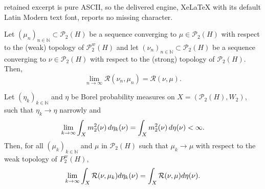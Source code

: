 \documentclass[10pt,a4paper]{amsart}
\newcommand{\N}{\mathbb{N}}
\renewcommand{\P}{\mathcal{P}}
\newcommand{\X}{\mathcal{P}_2(H)}
\renewcommand{\d}{{\rm d}}
\begin{document}
retained excerpt is pure ASCII, so the delivered engine, XeLaTeX with its default Latin Modern text font, reports no missing character.
\begin{lemma}
\label{lemma:Rcont}
Let $(\mu_n)_{n\in \N}\subset \X$ be a sequence converging to $\mu \in \X$ with respect to the (weak) topology of $\P_2^w(H)$ and let $(\nu_n)_{n\in \N}\subset \X$ be a sequence converging to $\nu \in \X$ with respect to the (strong) topology of $\P_2(H)$. 
Then, %
\begin{equation}
\label{eq:lsc_2}
	\lim_{n \to \infty}\mathcal R (\nu_n,\mu_n)=\mathcal R (\nu,\mu).
\end{equation}
\end{lemma}

\begin{lemma}
\label{lemma:gammaR}
Let $(\eta_k)_{k\in \N}$ and $\eta$ be Borel probability measures on $X=(\X,W_2)$, such that $\eta_k \to \eta$ narrowly and
\begin{equation}
\label{eq:m2conv}
	\lim_{k\to \infty} \int_{X}m_2^2(\nu)\,\d\eta_k(\nu) = \int_{X}m_2^2(\nu)\,\d\eta(\nu) < \infty.
\end{equation}
Then, for all $(\mu_k)_{k \in \N}$ and $\mu$ in $\X$ such that $\mu_k \to \mu$ with respect to the weak topology of $P_2^w(H)$,
\[
	\lim_{k \to \infty} \int_X \mathcal{R}(\nu,\mu_k)\d\eta_k(\nu) = \int_X \mathcal{R}(\nu,\mu)\d\eta(\nu).
\]
\end{lemma}
\end{document}
